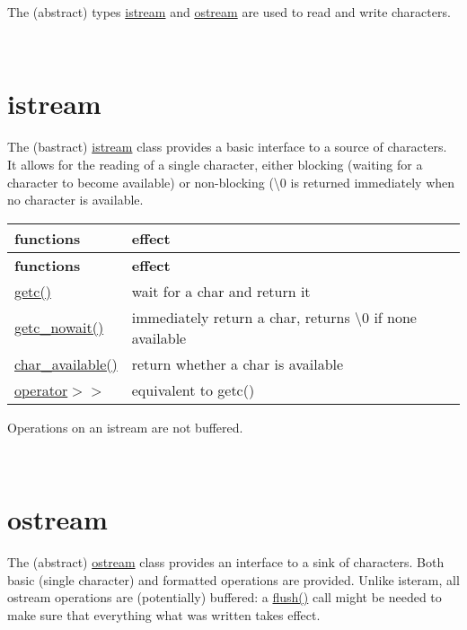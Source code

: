 The (abstract) types \hyperlink{char-io_istream}{istream} and \hyperlink{char-io_ostream}{ostream} are used to read and write characters.

~\newline
 

\hypertarget{char-io_istream}{}\section{istream}\label{char-io_istream}
The (bastract) \hyperlink{classhwlib_1_1istream}{istream} class provides a basic interface to a source of characters. It allows for the reading of a single character, either blocking (waiting for a character to become available) or non-\/blocking (\textquotesingle{}\textbackslash{}0\textquotesingle{} is returned immediately when no character is available.

\tabulinesep=1mm
\begin{longtabu} spread 0pt [c]{*{2}{|X[-1]}|}
\hline
\rowcolor{\tableheadbgcolor}\textbf{ functions }&\textbf{ effect  }\\
\endfirsthead
\hline
\endfoot
\hline
\rowcolor{\tableheadbgcolor}\textbf{ functions }&\textbf{ effect  }\\
\endhead
\hyperlink{classhwlib_1_1istream_a9a260f800b08d4788b9e399f65d1c728}{getc()} &wait for a char and return it \\
\hyperlink{classhwlib_1_1istream_aa4ff0ebb0bd23b9fb765520aa49416f4}{getc\+\_\+nowait()} &immediately return a char, returns \textquotesingle{}\textbackslash{}0\textquotesingle{} if none available \\
\hyperlink{classhwlib_1_1istream_a77c1ce784f42922cd4758f2d8a6c59b3}{char\+\_\+available()} &return whether a char is available \\
\hyperlink{classhwlib_1_1istream_a88dabf0f321a5f098ede5ee108d0a92b}{operator$>$$>$} &equivalent to getc() \\
\end{longtabu}
Operations on an istream are not buffered.

~\newline
 

\hypertarget{char-io_ostream}{}\section{ostream}\label{char-io_ostream}
The (abstract) \hyperlink{classhwlib_1_1ostream}{ostream} class provides an interface to a sink of characters. Both basic (single character) and formatted operations are provided. Unlike isteram, all ostream operations are (potentially) buffered\+: a \hyperlink{namespacehwlib_a648fe94ca9899747a632c23f97007732}{flush()} call might be needed to make sure that everything what was written takes effect.

